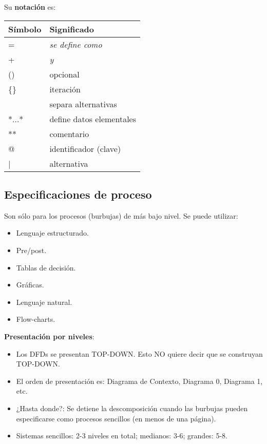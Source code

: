 Su \textbf{notación} es:

\begin{center}
  \begin{tabular}[h]{ l | l }
    \textbf{Símbolo}   & \textbf{Significado} \\
    \hline
    =                  & \textit{se define como} \\
    +                  & \textit{y} \\
    ()                 & opcional \\
    \{\}               & iteración \\
    \big[\big]         & separa alternativas \\
    *...*              & define datos elementales \\
    **                 & comentario \\
    @                  & identificador (clave) \\
    |                  & alternativa \\
  \end{tabular}
\end{center}

\subsection{Especificaciones de proceso}

Son sólo para los procesos (burbujas) de más bajo nivel. Se puede utilizar:

\begin{itemize}[noitemsep]
\item Lenguaje estructurado.
\item Pre/post.
\item Tablas de decisión.
\item Gráficas.
\item Lenguaje natural.
\item Flow-charts.
\end{itemize}

\textbf{Presentación por niveles}:

\begin{itemize}[noitemsep]
\item Los DFDs se presentan TOP-DOWN. Esto NO quiere decir que se construyan TOP-DOWN.
\item El orden de presentación es: Diagrama de Contexto, Diagrama 0, Diagrama 1, etc.
\item ¿Hasta donde?: Se detiene la descomposición cuando las burbujas pueden especificarse como procesos sencillos (en menos de una página).
\item Sistemas sencillos: 2-3 niveles en total; medianos: 3-6; grandes: 5-8.
\end{itemize}


